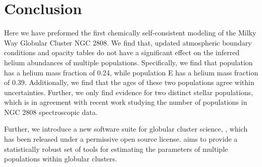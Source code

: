 \section{Conclusion}\label{sec:conclusion}
Here we have preformed the first chemically self-consistent modeling of the
Milky Way Globular Cluster NGC 2808. We find that, updated atmospheric boundary
conditions and opacity tables do not have a significant effect on the inferred
helium abundances of multiple populations. Specifically, we find that
population  has a helium mass fraction of 0.24, while population E has a helium
mass fraction of 0.39. Additionally, we find that the ages of these two populations 
agree within uncertainties. Further, we only find evidence for two distinct stellar
populations, which is in agreement with recent work studying the number
of populations in NGC 2808 spectroscopic data.

Further, we introduce a new software suite for globular cluster science,
\fidanka, which has been released under a permissive open source license.
\fidanka aims to provide a statistically robust set of tools for estimating the
parameters of multiple populations within globular clusters.
